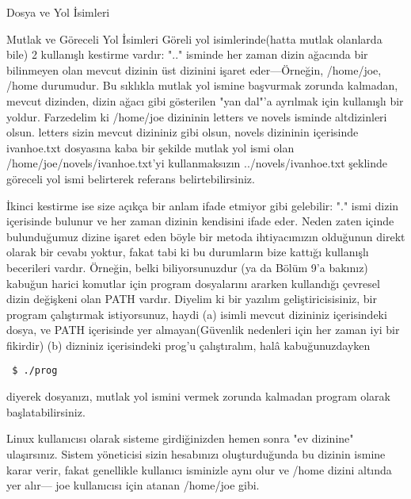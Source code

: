 \begin{section}{Dosya ve Yol İsimleri}
\begin{subsection}{Mutlak ve Göreceli Yol İsimleri}
	Göreli yol isimlerinde(hatta mutlak olanlarda bile) 2 kullanışlı kestirme vardır: ".." isminde her zaman dizin ağacında bir bilinmeyen olan mevcut dizinin üst dizinini işaret eder—Örneğin, /home/joe, /home durumudur. Bu sıklıkla mutlak yol ismine başvurmak zorunda kalmadan, mevcut dizinden, dizin ağacı gibi gösterilen "yan dal"'a ayrılmak için kullanışlı bir yoldur. Farzedelim ki /home/joe dizininin letters ve novels isminde altdizinleri olsun. letters sizin mevcut dizininiz gibi olsun, novels dizininin içerisinde ivanhoe.txt dosyasına kaba bir şekilde mutlak yol ismi olan /home/joe/novels/ivanhoe.txt'yi kullanmaksızın ../novels/ivanhoe.txt şeklinde göreceli yol ismi belirterek referans belirtebilirsiniz.
	
	İkinci kestirme ise size açıkça bir anlam ifade etmiyor gibi gelebilir: "." ismi dizin içerisinde bulunur ve her zaman dizinin kendisini ifade eder. Neden zaten içinde bulunduğumuz dizine işaret eden böyle bir metoda ihtiyacımızın olduğunun direkt olarak bir cevabı yoktur, fakat  tabi ki bu durumların bize kattığı kullanışlı becerileri vardır. Örneğin, belki biliyorsunuzdur (ya da Bölüm 9'a bakınız) kabuğun harici komutlar için program dosyalarını ararken kullandığı çevresel dizin değişkeni olan PATH vardır. Diyelim ki bir yazılım geliştiricisisiniz, bir program çalıştırmak istiyorsunuz, haydi (a) isimli mevcut dizininiz içerisindeki dosya, ve PATH içerisinde yer almayan(Güvenlik nedenleri için her zaman iyi bir fikirdir) (b) dizniniz içerisindeki prog'u çalıştıralım, halâ kabuğunuzdayken
\begin{verbatim}
 $ ./prog
\end{verbatim} 
diyerek dosyanızı, mutlak yol ismini vermek zorunda kalmadan program olarak başlatabilirsiniz.

Linux kullanıcısı olarak sisteme girdiğinizden hemen sonra "ev dizinine" ulaşırsınız. Sistem yöneticisi sizin hesabınızı oluşturduğunda bu dizinin ismine karar verir, fakat genellikle kullanıcı isminizle aynı olur ve /home dizini altında yer alır— joe kullanıcısı için atanan /home/joe gibi.

\end{subsection}
\end{section}

